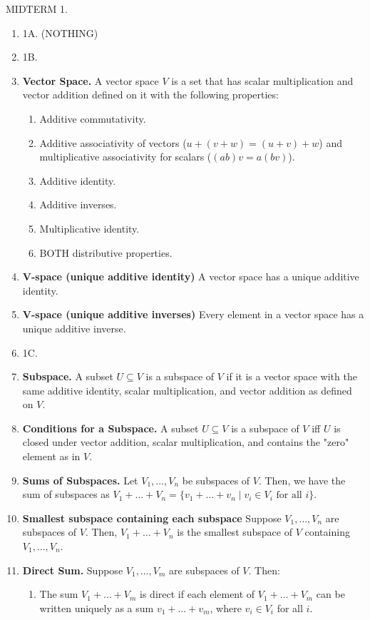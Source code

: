 

MIDTERM 1. 
\begin{enumerate}
	\item 1A. (NOTHING)
	\item 1B. 
	\item \textbf{Vector Space. } A vector space $V$ is a set that has scalar multiplication and vector addition defined on it with the following properties: 
	\begin{enumerate}
		\item Additive commutativity. 
		\item Additive associativity of vectors ($u+(v+w)=(u+v)+w$) and multiplicative associativity for scalars ($(ab)v = a(bv)$). 
		\item Additive identity. 
		\item Additive inverses. 
		\item Multiplicative identity. 
		\item BOTH distributive properties. 
	\end{enumerate}
	\item \textbf{V-space (unique additive identity) } A vector space has a unique additive identity. 
	\item \textbf{V-space (unique additive inverses) } Every element in a vector space has a unique additive inverse. 
	\item 1C. 
	\item \textbf{Subspace. } A subset $U \subseteq V$ is a subspace of $V$ if it is a vector space with the same additive identity, scalar multiplication, and vector addition as defined on $V$. 
	\item \textbf{Conditions for a Subspace. } A subset $U \subseteq V$ is a subspace of $V$ iff $U$ is closed under vector addition, scalar multiplication, and contains the "zero" element as in $V$. 
	\item \textbf{Sums of Subspaces. } Let $V_1,\dots,V_n$ be subspaces of $V$. Then, we have the sum of subspaces as $V_1 + \dots + V_n = \{v_1 + \dots + v_n \mid v_i \in V_i \textrm{ for all } i\}$. 
	\item \textbf{Smallest subspace containing each subspace} Suppose $V_1,\dots,V_n$ are subspaces of $V$. Then, $V_1 + \dots + V_n$ is the smallest subspace of $V$ containing $V_1,\dots,V_n$. 
	\item \textbf{Direct Sum. } Suppose $V_1,\dots,V_m$ are subspaces of $V$. Then: 
	\begin{enumerate}
		\item The sum $V_1 + \dots + V_m$ is direct if each element of $V_1 + \dots + V_m$ can be written uniquely as a sum $v_1 + \dots + v_m$, where $v_i \in V_i$ for all $i$. 

\end{enumerate}
\end{enumerate}
